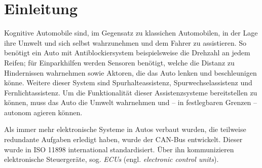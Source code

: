 
\section{Einleitung}
Kognitive Automobile sind, im Gegensatz zu klassichen Automobilen, in der Lage
ihre Umwelt und sich selbst wahrzunehmen und dem Fahrer zu assistieren. So
benötigt ein Auto mit Antiblockiersystem beispielsweise die Drehzahl an jedem
Reifen; für Einparkhilfen werden Sensoren benötigt, welche die Distanz zu
Hindernissen wahrnehmen sowie Aktoren, die das Auto lenken und beschleunigen
könne. Weitere dieser System sind Spurhalteassistenz, Spurwechselassistenz und
Fernlichtassistenz. Um die Funktionalität dieser Assistenzsysteme bereitstellen
zu können, muss das Auto die Umwelt wahrnehmen und -- in festlegbaren Grenzen
-- autonom agieren können.

Als immer mehr elektronische Systeme in Autos verbaut wurden, die teilweise
redundante Aufgaben erledigt haben, wurde der CAN-Bus
entwickelt\cite{Kiencke1986}. Dieser wurde in ISO 11898 international
standardisiert. Über ihn kommunizieren elektronische Steuergeräte, sog.
\textit{ECUs} (engl. \textit{electronic control units}).